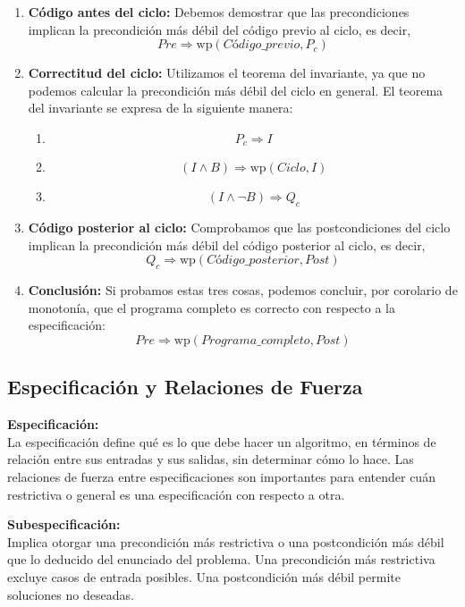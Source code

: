 \documentclass[9pt]{extarticle}  %
\begin{document}
\begin{enumerate}
    \item \textbf{Código antes del ciclo:} Debemos demostrar que las precondiciones implican la precondición más débil del código previo al ciclo, es decir,
    \[ Pre \Rightarrow \text{wp}(Código\_previo, P_c) \]
    
    \item \textbf{Correctitud del ciclo:} Utilizamos el teorema del invariante, ya que no podemos calcular la precondición más débil del ciclo en general. El teorema del invariante se expresa de la siguiente manera:
    
    \begin{enumerate}
        \item \[ P_c \Rightarrow I \]
        \item \[ (I \land B) \Rightarrow \text{wp}(Ciclo, I) \]
        \item \[ (I \land \neg B) \Rightarrow Q_c \]
    \end{enumerate}

    \item \textbf{Código posterior al ciclo:} Comprobamos que las postcondiciones del ciclo implican la precondición más débil del código posterior al ciclo, es decir,
    \[ Q_c \Rightarrow \text{wp}(Código\_posterior, Post) \]

    \item \textbf{Conclusión:} Si probamos estas tres cosas, podemos concluir, por corolario de monotonía, que el programa completo es correcto con respecto a la especificación:
    \[ Pre \Rightarrow \text{wp}(Programa\_completo, Post) \]
\end{enumerate}
\subsection*{\tiny{Especificación y Relaciones de Fuerza}}

\noindent\textbf{Especificación:} \\
La especificación define qué es lo que debe hacer un algoritmo, en términos de relación entre sus entradas y sus salidas, sin determinar cómo lo hace. Las relaciones de fuerza entre especificaciones son importantes para entender cuán restrictiva o general es una especificación con respecto a otra.

\noindent\textbf{Subespecificación:} \\
Implica otorgar una precondición más restrictiva o una postcondición más débil que lo deducido del enunciado del problema. Una precondición más restrictiva excluye casos de entrada posibles. Una postcondición más débil permite soluciones no deseadas.
\end{document}
